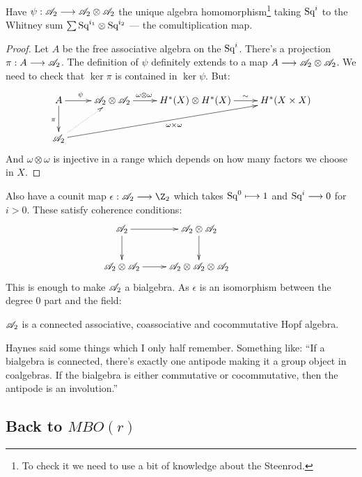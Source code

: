 \documentclass[11pt]{article}
\begin{document}
\begin{JeremyThomTalk}
\begin{prop*}
Have $\psi:\mathscr{A}_2\longrightarrow\mathscr{A}_2\otimes\mathscr{A}_2$ the unique algebra homomorphism\footnote{To check it we need to use a bit of knowledge about the Steenrod.} taking $\textup{Sq}^i$ to the Whitney sum $\sum \textup{Sq}^{i_1}\otimes\textup{Sq}^{i_2}$ --- the comultiplication map.
\end{prop*}
\begin{proof}
Let $A$ be the free associative algebra on the $\textup{Sq}^i$. There's a projection $\pi:A\longrightarrow\mathscr{A}_2$. The definition of $\psi$ definitely extends to a map $A\longrightarrow\mathscr{A}_2\otimes\mathscr{A}_2$. We need to check that $\ker\pi$ is contained in $\ker\psi$. But:
\[\xymatrix{
A\ar[r]^{\psi\quad}\ar[d]_\pi&\Steen\otimes\Steen
\ar[r]^{\omega\otimes\omega\qquad}&H^*(X)\otimes H^*(X)\ar[r]^{\quad\sim}&H^*(X\times X)\\
\Steen\ar[rrru]_{\omega\times\omega}\ar@{..>}[ur]
}\]
And $\omega\otimes\omega$ is injective in a range which depends on how many factors we choose in $X$.
\end{proof}
Also have a counit map $\epsilon:\Steen\to\Z_2$ which takes $\textup{Sq}^0\longmapsto 1$ and $\textup{Sq}^i\longrightarrow0$ for $i>0$. These satisfy coherence conditions:
\[\xymatrix{\Steen\ar[r]\ar[d]&\Steen\otimes\Steen\ar[d]&\\
\Steen\otimes\Steen\ar[r]&\Steen\otimes\Steen\otimes\Steen}\]
This is enough to make $\mathscr{A}_2$ a bialgebra. As $\epsilon$ is an isomorphism between the degree 0 part and the field:
\begin{fact*}
$\mathscr{A}_2$ is a connected associative, coassociative and cocommutative Hopf algebra.
\end{fact*}
\begin{rmk*}
Haynes said some things which I only half remember. Something like:
``If a bialgebra is connected, there's exactly one antipode making it a group object in coalgebras. If the bialgebra is either commutative or cocommutative, then the antipode is an involution.''

\end{rmk*}
\noindent 
\subsection*{Back to $MBO(r)$}


\end{JeremyThomTalk}
\end{document}

